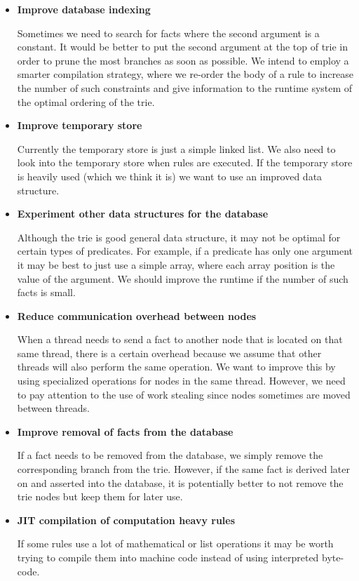 \begin{itemize}
   \item \textbf{Improve database indexing}
   
   Sometimes we need to search for facts where the second argument is a constant. It would be better to put the second argument at the top of trie in order to prune the most branches as soon as possible. We intend to employ a smarter compilation strategy, where we re-order the body of a rule to increase the number of such constraints and give information to the runtime system of the optimal ordering of the trie.
   
   \item \textbf{Improve temporary store}
   
   Currently the temporary store is just a simple linked list. We also need to look into the temporary store when rules are executed. If the temporary store is heavily used (which we think it is) we want to use an improved data structure.
   
   \item \textbf{Experiment other data structures for the database}
   
   Although the trie is good general data structure, it may not be optimal for certain types of predicates. For example, if a predicate has only one argument it may be best to just use a simple array, where each array position is the value of the argument. We should improve the runtime if the number of such facts is small.
   
   \item \textbf{Reduce communication overhead between nodes}
   
   When a thread needs to send a fact to another node that is located on that same thread, there is a certain overhead because we assume that other threads will also perform the same operation. We want to improve this by using specialized operations for nodes in the same thread. However, we need to pay attention to the use of work stealing since nodes sometimes are moved between threads.
   
   \item \textbf{Improve removal of facts from the database}

   If a fact needs to be removed from the database, we simply remove the corresponding branch from the trie. However, if the same fact is derived later on and asserted into the database, it is potentially better to not remove the trie nodes but keep them for later use.
   
   \item \textbf{JIT compilation of computation heavy rules}
   
   If some rules use a lot of mathematical or list operations it may be worth trying to compile them into machine code instead of using interpreted byte-code.
\end{itemize}

